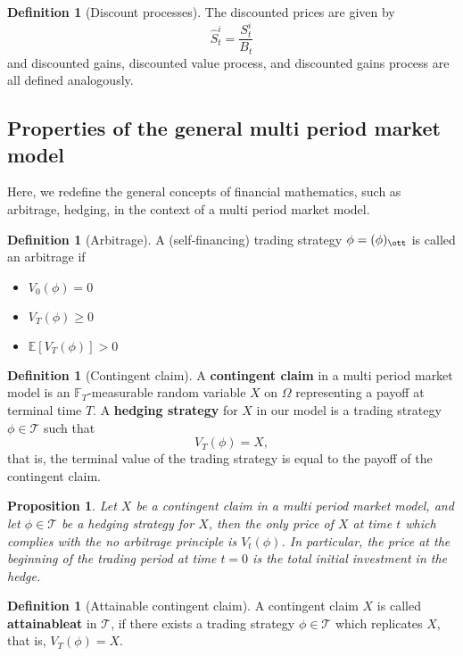 \documentclass[10pt, oneside, reqno]{amsart}
\theoremstyle{plain}%
\newtheorem{prop}[thm]{Proposition}
\theoremstyle{definition}
\newtheorem{defn}[thm]{Definition}
\theoremstyle{remark}
\newcommand{\expc}[1]{\mathbb{E}\left[#1\right]}
\newcommand{\F}{\mathbb{F}}
\begin{document}
\begin{defn}[Discount processes]
    The discounted prices are given by \[
        \hat{S}^i_t = \frac{S^i_t}{B_t}
    \] and discounted gains, discounted value process, and discounted gains process are all defined analogously.  
\end{defn}



\subsection{Properties of the general multi period market model} %
\label{sub:properties_of_the_general_multi_period_market_model}
Here, we redefine the general concepts of financial mathematics, such as arbitrage, hedging, in the context of a multi period market model.

\begin{defn}[Arbitrage]
    A (self-financing) trading strategy $\phi = (\phi)_{\ott}$ is called an arbitrage if \begin{itemize}
        \item $V_0(\phi) = 0$
        \item $V_T(\phi) \geq 0$
        \item $\expc{V_T(\phi)} > 0$
    \end{itemize}
\end{defn}

\begin{defn}[Contingent claim] A \textbf{contingent claim} in a multi period market model is an $\F_T$-measurable random variable $X$ on $\Omega$ representing a payoff at terminal time $T$.  A \textbf{hedging strategy} for $X$ in our model is a trading strategy $\phi \in \mathcal{T}$ such that \[
    V_T(\phi) = X,
\] that is, the terminal value of the trading strategy is equal to the payoff of the contingent claim.
\end{defn}

\begin{prop}Let $X$ be a contingent claim in a multi period market model, and let $\phi \in \mathcal{T}$ be a hedging strategy for $X$, then the only price of $X$ at time $t$ which complies with the no arbitrage principle is $V_t(\phi)$.  In particular, the price at the beginning of the trading period at time $t = 0$ is the total initial investment in the hedge.
\end{prop}

\begin{defn}[Attainable contingent claim] A contingent claim $X$ is called \textbf{attainableat} in $\mathcal{T}$, if there exists a trading strategy $\phi \in \mathcal{T}$ which replicates $X$, that is, $V_T(\phi) = X$.
\end{defn}
\end{document}
